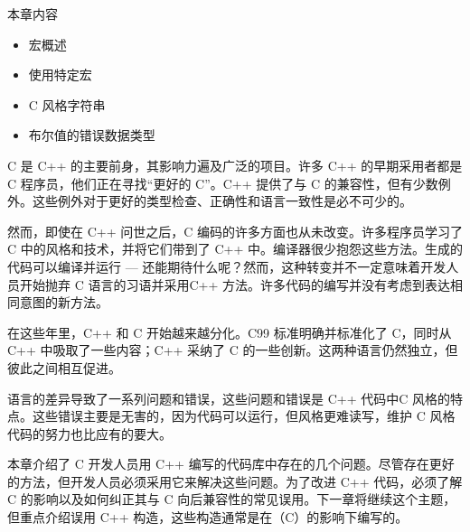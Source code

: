 本章内容

\begin{itemize}
\item
宏概述

\item
使用特定宏

\item
C 风格字符串

\item
布尔值的错误数据类型
\end{itemize}

C 是 C++ 的主要前身，其影响力遍及广泛的项目。许多 C++ 的早期采用者都是 C 程序员，他们正在寻找“更好的 C”。C++ 提供了与 C 的兼容性，但有少数例外。这些例外对于更好的类型检查、正确性和语言一致性是必不可少的。

然而，即使在 C++ 问世之后，C 编码的许多方面也从未改变。许多程序员学习了 C 中的风格和技术，并将它们带到了 C++ 中。编译器很少抱怨这些方法。生成的代码可以编译并运行 — 还能期待什么呢？然而，这种转变并不一定意味着开发人员开始抛弃 C 语言的习语并采用C++ 方法。许多代码的编写并没有考虑到表达相同意图的新方法。

在这些年里，C++ 和 C 开始越来越分化。C99 标准明确并标准化了 C，同时从 C++ 中吸取了一些内容；C++ 采纳了 C 的一些创新。这两种语言仍然独立，但彼此之间相互促进。

语言的差异导致了一系列问题和错误，这些问题和错误是 C++ 代码中C 风格的特点。这些错误主要是无害的，因为代码可以运行，但风格更难读写，维护 C 风格代码的努力也比应有的要大。

本章介绍了 C 开发人员用 C++ 编写的代码库中存在的几个问题。尽管存在更好的方法，但开发人员必须采用它来解决这些问题。为了改进 C++ 代码，必须了解 C 的影响以及如何纠正其与 C 向后兼容性的常见误用。下一章将继续这个主题，但重点介绍误用 C++ 构造，这些构造通常是在（C）的影响下编写的。







